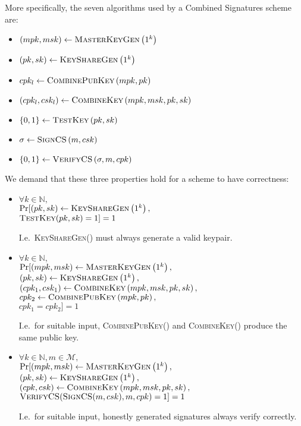   More specifically, the seven algorithms used by a Combined Signatures
  scheme are:
  \begin{itemize}
    \item $\left(mpk, msk\right) \gets \textsc{MasterKeyGen}\left(1^k\right)$
    \item $\left(pk, sk\right) \gets \textsc{KeyShareGen}\left(1^k\right)$
    \item $cpk_l \gets \textsc{CombinePubKey}\left(mpk, pk\right)$
    \item $\left(cpk_l, csk_l\right) \gets \textsc{CombineKey}\left(mpk,
    msk, pk, sk\right)$
    \item $\{0, 1\} \gets \textsc{TestKey}\left(pk, sk\right)$
    \item $\sigma \gets \textsc{SignCS}\left(m, csk\right)$
    \item $\left\{0, 1\right\} \gets \textsc{VerifyCS}\left(\sigma, m,
    cpk\right)$
  \end{itemize}
  We demand that these three properties hold for a scheme to have
  correctness:
  \begin{itemize}
    \item $\forall k \in \mathbb{N},$ \\
    $\Pr[\left(pk, sk\right) \gets \textsc{KeyShareGen}\left(1^k\right),$ \\
    $\textsc{TestKey}(pk, sk) = 1] = 1$

    I.e.\ \textsc{KeyShareGen}() must always generate a valid keypair.

    \item $\forall k \in \mathbb{N},$ \\
    $\Pr[(mpk, msk) \gets \textsc{MasterKeyGen}\left(1^k\right),$ \\
    $\left(pk, sk\right) \gets \textsc{KeyShareGen}\left(1^k\right),$ \\
    $\left(cpk_1, csk_1\right) \gets \textsc{CombineKey}\left(mpk, msk, pk,
    sk\right),$ \\
    $cpk_2 \gets \textsc{CombinePubKey}\left(mpk, pk\right),$ \\
    $cpk_1 = cpk_2] = 1$

    I.e.\ for suitable input, \textsc{CombinePubKey}() and
    \textsc{CombineKey}() produce the same public key.

    \item $\forall k \in \mathbb{N}, m \in \mathcal{M},$ \\
    $\Pr[(mpk, msk) \gets \textsc{MasterKeyGen}\left(1^k\right),$ \\
    $\left(pk, sk\right) \gets \textsc{KeyShareGen}\left(1^k\right),$ \\
    $\left(cpk, csk\right) \gets \textsc{CombineKey}\left(mpk, msk, pk,
    sk\right),$ \\
    $\textsc{VerifyCS}(\textsc{SignCS}(m, csk), m, cpk) = 1] = 1$

    I.e.\ for suitable input, honestly generated signatures always verify
    correctly.
  \end{itemize}

